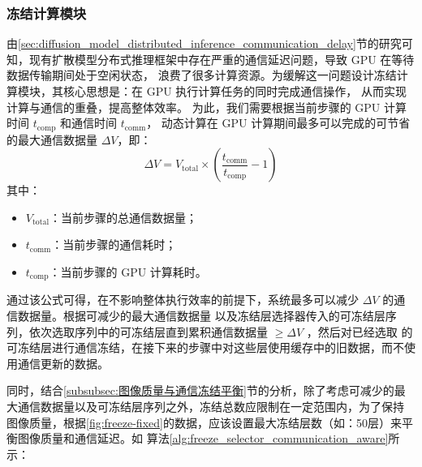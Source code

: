 \subsubsection{冻结计算模块}
由\ref{sec:diffusion_model_distributed_inference_communication_delay}节的研究可知，现有扩散模型分布式推理框架中存在严重的通信延迟问题，导致 GPU 在等待数据传输期间处于空闲状态，
浪费了很多计算资源。为缓解这一问题设计冻结计算模块，其核心思想是：在 GPU 执行计算任务的同时完成通信操作，
从而实现计算与通信的重叠，提高整体效率。
为此，我们需要根据当前步骤的 GPU 计算时间 $t_{\text{comp}}$ 和通信时间 $t_{\text{comm}}$，
动态计算在 GPU 计算期间最多可以完成的可节省的最大通信数据量 $\Delta V$，即：
\begin{equation}
    \Delta V = V_{\text{total}} \times \left( \frac{t_{\text{comm}}}{t_{\text{comp}}} - 1 \right)
\end{equation}
其中：
\begin{itemize}
    \item $V_{\text{total}}$：当前步骤的总通信数据量；
    \item $t_{\text{comm}}$：当前步骤的通信耗时；
    \item $t_{\text{comp}}$：当前步骤的 GPU 计算耗时。
\end{itemize}
\par
通过该公式可得，在不影响整体执行效率的前提下，系统最多可以减少 $\Delta V$ 的通信数据量。根据可减少的最大通信数据量
以及冻结层选择器传入的可冻结层序列，依次选取序列中的可冻结层直到累积通信数据量 $\geq \Delta V$ ，然后对已经选取
的可冻结层进行通信冻结，在接下来的步骤中对这些层使用缓存中的旧数据，而不使用通信更新的数据。
\par
同时，结合\ref{subsubsec:图像质量与通信冻结平衡}节的分析，除了考虑可减少的最大通信数据量以及可冻结层序列之外，冻结总数应限制在一定范围内，为了保持
图像质量，根据\autoref{fig:freeze-fixed}的数据，应该设置最大冻结层数（如：50层）来平衡图像质量和通信延迟。如
算法\ref{alg:freeze_selector_communication_aware}所示：
